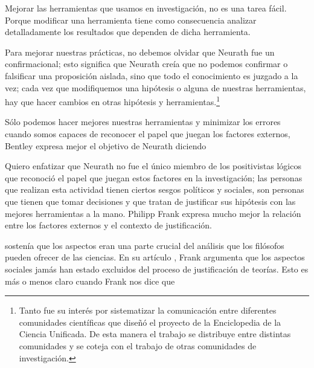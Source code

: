 Mejorar las herramientas que usamos en investigación, no es una tarea fácil. 
Porque modificar una herramienta tiene como consecuencia analizar detalladamente los resultados que dependen de dicha herramienta.

Para mejorar nuestras prácticas, no debemos olvidar que Neurath fue un  confirmacional; esto significa que Neurath creía que no podemos confirmar o falsificar una proposición aislada, sino que todo el conocimiento es juzgado a la vez; 
cada vez que modifiquemos una hipótesis o alguna de nuestras herramientas, hay que hacer cambios en otras hipótesis y herramientas.\footnote{
	Tanto fue su interés por sistematizar la comunicación entre diferentes comunidades científicas que diseñó el proyecto de la Enciclopedia de la  Ciencia Unificada.
	De esta manera el trabajo se distribuye entre distintas comunidades y se coteja con el trabajo de otras comunidades de investigación.
	}

Sólo podemos hacer mejores nuestras herramientas y minimizar los errores cuando somos capaces de reconocer el papel que juegan los factores externos, Bentley expresa mejor el objetivo de Neurath diciendo  \parencite[p.~41]{Bentley2023}

Quiero enfatizar que Neurath no fue el único miembro de los positivistas lógicos que reconoció el papel que juegan estos factores en la investigación;
las personas que realizan esta actividad tienen ciertos sesgos políticos y sociales, son personas que tienen que tomar decisiones y que tratan de justificar sus hipótesis con las mejores herramientas a la mano.
Philipp Frank expresa mucho mejor la relación entre los factores externos y el contexto de justificación.



 sostenía que los aspectos  eran una parte crucial del análisis que los filósofos pueden ofrecer de las ciencias.
En su artículo , Frank argumenta que los aspectos sociales jamás han estado excluidos del proceso de justificación de teorías.
Esto es más o menos claro cuando Frank nos dice que  \parencite[p.~143]{Frank1954}

